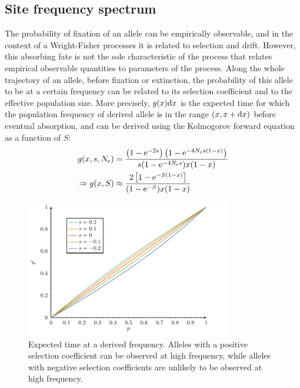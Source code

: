\subsection{Site frequency spectrum}
The probability of fixation of an allele can be empirically observable, and in the context of a Wright-Fisher processes it is related to selection and drift.
However, this absorbing fate is not the sole characteristic of the process that relates empirical observable quantities to parameters of the process.
Along the whole trajectory of an allele, before fixation or extinction, the probability of this allele to be at a certain frequency can be related to its selection coefficient and to the effective population size.
More precisely, $g(x) \mathrm{d} x $ is the expected time for which the population frequency of derived allele is in the range $(x, x+\mathrm{d} x)$ before eventual absorption, and can be derived using the Kolmogorov forward equation as a function of $S$:
\begin{align}
    g(x, s, N_{\textrm{e}}) & = \dfrac{\left( 1 - \mathrm{e}^{- 2 s }\right) \left( 1 - \mathrm{e}^{-4 N_{\textrm{e}} s(1-x)}\right)}{ s (1 - \mathrm{e}^{-4 N_{\textrm{e}} s})x(1-x)} \\
    \Rightarrow g(x, S) & \approx \dfrac{2 \left[ 1 - \mathrm{e}^{-S(1-x)}\right]}{(1 - \mathrm{e}^{-S})x(1-x)} \label{eq:expected_time}
\end{align}

\begin{figure}[H]
    \centering
    \includegraphics[width=0.8\textwidth, page=4] {figures.pdf}
    \caption[Expected time at a derived frequency]{
    Expected time at a derived frequency.
    Alleles with a positive selection coefficient can be observed at high frequency, while alleles with negative selection coefficients are unlikely to be observed at high frequency.}
\end{figure}

